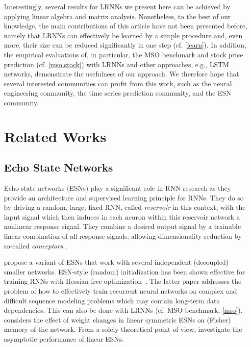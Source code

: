 \documentclass[twoside,11pt]{article}
\theoremstyle{definition}
\begin{document}
Interestingly, several results for LRNNs we present here can be achieved by
applying linear algebra and matrix analysis. Nonetheless, to the best of our
knowledge, the main contributions of this article have not been presented
before, namely that LRNNs can effectively be learned by a simple procedure and,
even more, their size can be reduced significantly in one step (cf.
\cref{learn}). In addition, the empirical evaluations of, in particular, the MSO
benchmark and stock price prediction (cf. \cref{mso,stock}) with LRNNs and other
approaches, e.g., LSTM networks, demonstrate the usefulness of our approach. We
therefore hope that several interested communities can profit from this work,
such as the neural engineering community, the time series prediction community,
and the ESN community.

\section{Related Works}\label{related}

\subsection{Echo State Networks}

Echo state networks (ESNs) \citep{JH04,Jae07} play a significant role in RNN
research as they provide an architecture and supervised learning principle for
RNNs. They do so by driving a random, large, fixed RNN, called \emph{reservoir}
in this context, with the input signal which then induces in each neuron within
this reservoir network a nonlinear response signal. They combine a desired
output signal by a trainable linear combination of all response signals,
allowing dimensionality reduction by so-called \emph{conceptors} \citep{Jae14,Jae17}.

\citet{XYH07} propose a variant of ESNs that work with several independent
(decoupled) smaller networks. ESN-style (random) initialization has been shown
effective for training RNNs with Hessian-free optimization~\citep{MS11}. The
latter paper addresses the problem of how to effectively train recurrent neural
networks on complex and difficult sequence modeling problems which may contain
long-term data dependencies. This can also be done with LRNNs (cf. MSO
benchmark, \cref{mso}).
\citet{Tin18} considers the effect of weight changes in linear symmetric ESNs on
(Fisher) memory of the network. From a solely theoretical point of view,
\citet{CW+16} investigate the asymptotic performance of linear ESNs.
\end{document}
